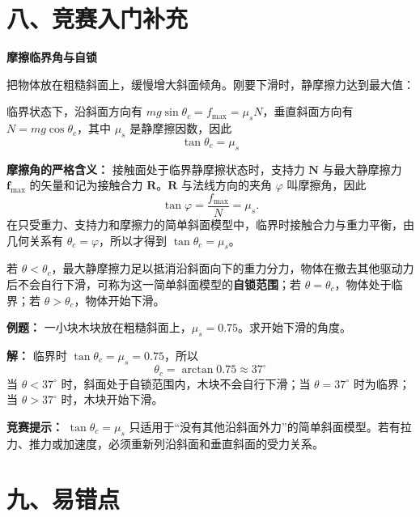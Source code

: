 \section*{八、竞赛入门补充}

\begin{competitionbox}
\textbf{摩擦临界角与自锁}

把物体放在粗糙斜面上，缓慢增大斜面倾角。刚要下滑时，静摩擦力达到最大值：

\begin{center}


\label{fig:friction-angle}
\end{center}

临界状态下，沿斜面方向有 $mg\sin\theta_c=f_{\max}=\mu_sN$，垂直斜面方向有 $N=mg\cos\theta_c$，其中 $\mu_s$ 是静摩擦因数，因此
\[
  \tan\theta_c=\mu_s
\]

\textbf{摩擦角的严格含义：} 接触面处于临界静摩擦状态时，支持力 $\boldsymbol N$ 与最大静摩擦力 $\boldsymbol f_{\max}$ 的矢量和记为接触合力 $\boldsymbol R$。$\boldsymbol R$ 与法线方向的夹角 $\varphi$ 叫摩擦角，因此
\[
\tan\varphi=\frac{f_{\max}}{N}=\mu_s.
\]
在只受重力、支持力和摩擦力的简单斜面模型中，临界时接触合力与重力平衡，由几何关系有 $\theta_c=\varphi$，所以才得到 $\tan\theta_c=\mu_s$。

若 $\theta<\theta_c$，最大静摩擦力足以抵消沿斜面向下的重力分力，物体在撤去其他驱动力后不会自行下滑，可称为这一简单斜面模型的\textbf{自锁范围}；若 $\theta=\theta_c$，物体处于临界；若 $\theta>\theta_c$，物体开始下滑。

\textbf{例题：} 一小块木块放在粗糙斜面上，$\mu_s=0.75$。求开始下滑的角度。

\textbf{解：} 临界时 $\tan\theta_c=\mu_s=0.75$，所以
\[
\theta_c=\arctan 0.75\approx 37^\circ
\]
当 $\theta<37^\circ$ 时，斜面处于自锁范围内，木块不会自行下滑；当 $\theta=37^\circ$ 时为临界；当 $\theta>37^\circ$ 时，木块开始下滑。

\textbf{竞赛提示：} $\tan\theta_c=\mu_s$ 只适用于“没有其他沿斜面外力”的简单斜面模型。若有拉力、推力或加速度，必须重新列沿斜面和垂直斜面的受力关系。
\end{competitionbox}

\enlargethispage{2\baselineskip}
\section*{九、易错点}


